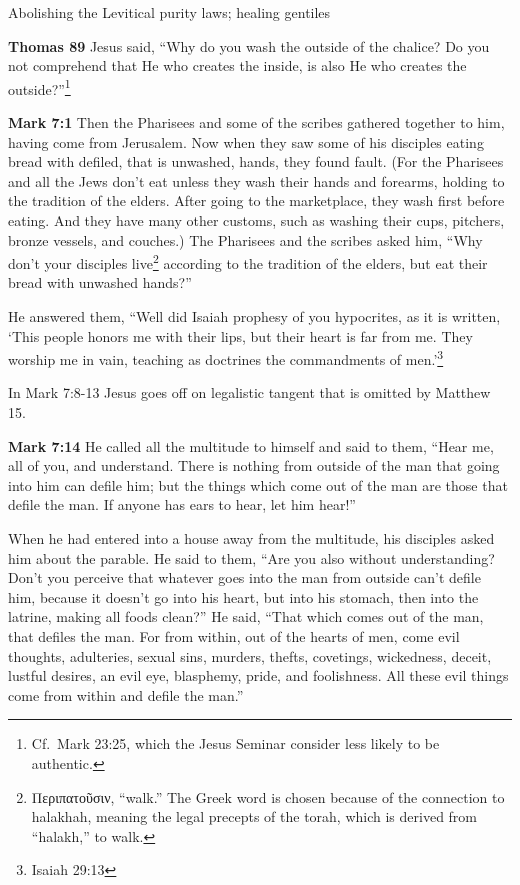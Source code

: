 \documentclass[10pt,twoside]{article} %
\newcommand{\quotesize}{\normalsize{}}
\newcommand{\comm}[1]{\begingroup \color{black!50} #1\endgroup}
\newenvironment{quotetext}{\begingroup\quotesize}{\endgroup}
\newcommand{\intex}[1]{\index[texts]{#1}}
\newcommand{\reftex}[1]{#1\intex{#1}}
\newcommand{\bible}[2]{\begin{quotetext}\textbf{#1}\intex{#1} #2\end{quotetext}}
\newcommand{\gospelmark}[2]{\bible{Mark #1}{#2}}
\newcommand{\thomas}[2]{\bible{Thomas #1}{#2}}
\begin{document}
\begin{section}{Abolishing the Levitical purity laws; healing gentiles}

\thomas{89}{
Jesus said, ``Why do you wash the outside of the chalice? Do you not comprehend that He who creates the inside, is also He who creates 
the outside?''\footnote{Cf.~Mark
23:25, which the Jesus Seminar consider less likely to be authentic.}
}

\gospelmark{7:1}{
 Then the Pharisees and some of the scribes gathered together to him, having come from Jerusalem.   Now when they saw some of his disciples eating bread with defiled, that is unwashed, hands, they found fault.   (For the Pharisees and all the Jews don't eat unless they wash their hands and forearms, holding to the tradition of the elders.
After going to the marketplace, they wash first before eating. And they have many other customs, such as washing
their cups, pitchers, bronze vessels, and couches.)   The Pharisees and the scribes asked him, ``Why don't your disciples 
live\footnote{Περιπατοῦσιν, ``walk.'' The Greek word is chosen because of the connection
to halakhah, meaning the legal precepts of the torah, which
is derived from ``halakh,'' to walk.} according to the tradition of the elders, but eat their bread with unwashed hands?''


  He answered them, ``Well did Isaiah prophesy of you hypocrites, as it is written,
`This people honors me with their lips,
but their heart is far from me.
   They worship me in vain,
teaching as doctrines the commandments of men.'\footnote{\reftex{Isaiah 29:13}}}

\comm{In \reftex{Mark 7:8-13} Jesus goes off on legalistic tangent that is omitted by Matthew 15.}

\gospelmark{7:14}{
  He called all the multitude to himself and said to them, ``Hear me, all of you, and understand.    There is nothing from outside of the man that going into him can defile him; but the things which come out of the man are those that defile the man.    If anyone has ears to hear, let him hear!''

  When he had entered into a house away from the multitude, his disciples asked him about the parable.   He said to them, ``Are you also without understanding? Don't you perceive that whatever goes into the man from outside can't defile him,    because it doesn't go into his heart, but into his stomach, then into the latrine, making all foods clean?''   He said, ``That which comes out of the man, that defiles the man.    For from within, out of the hearts of men, come evil thoughts, adulteries, sexual sins, murders, thefts,    covetings, wickedness, deceit, lustful desires, an evil eye, blasphemy, pride, and foolishness.    All these evil things come from within and defile the man.''
}


\end{section}
\end{document}

